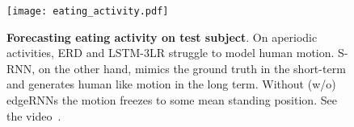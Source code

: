 \documentclass[10pt,twocolumn,letterpaper]{article}
\begin{document}
\begin{figure}[t]
\centering
\texttt{[image: eating\_activity.pdf]}
\caption{\footnotesize{\textbf{Forecasting eating activity on test subject}. On aperiodic activities, ERD and LSTM-3LR struggle to model human motion. S-RNN, on the other hand, mimics the ground truth in the short-term and generates human like motion in the long term. Without (w/o) edgeRNNs the motion freezes to some mean standing position. See the video~\cite{SuppSRNN}.}}
\label{fig:eating_videos}
\vspace{1.5\sectionReduceBot}
\end{figure}%
\end{document}
